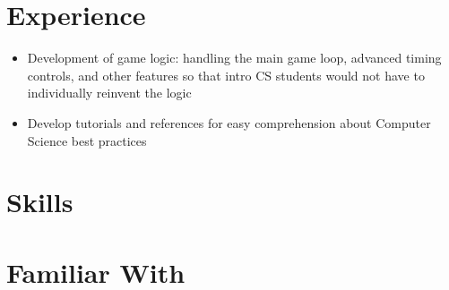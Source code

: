 \documentclass{my_cv}
\begin{document}
\section{Experience}
\begin{itemize}
\item Development of game logic:  handling the main game loop, advanced timing controls, and other features so that intro CS students would not have to individually reinvent the logic
\end{itemize}
\begin{itemize}
\item Develop tutorials and references for easy comprehension about Computer Science best practices
\end{itemize}


\section{Skills}

\section{Familiar With}



\end{document}
